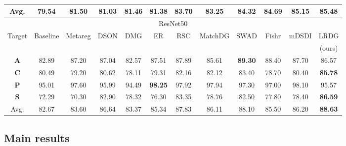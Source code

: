 \documentclass{article}
\begin{document}
\begin{table}[ht]
\begin{center}
\begin{tabular}{c|cccccccccc|c}
Avg. & 79.54 & 81.50 & 81.03 & 81.46 & 81.38 & 83.70 & 83.25 & 84.32 & 84.69 & 85.15 & \textbf{85.48}\\
\hline
\hline
\multicolumn{12}{c}{ResNet50}\\
\hline
\multirow{2}{*}{Target} & Baseline & Metareg & DSON & DMG & ER & RSC & MatchDG & SWAD & Fishr & mDSDI & LRDG\\
&  & \cite{balaji2018metareg} & \cite{seo2020learning} & \cite{chattopadhyay2020learning} & \cite{zhao2020domain} & \cite{huangRSC2020} &   \cite{mahajan2021domain} & \cite{cha2021swad} & \cite{rame2022fishr} & \cite{bui2021exploiting} & (ours) \\
\hline
\textbf{A} & 82.89 & 87.20 & 87.04 & 82.57 & 87.51 & 87.89 & 85.61 & \textbf{89.30} & 88.40 & 87.70 & 86.57 \\
\textbf{C} & 80.49 & 79.20 & 80.62 & 78.11 & 79.31 & 82.16 & 82.12 & 83.40 & 78.70 & 80.40 & \textbf{85.78} \\
\textbf{P} & 95.01 & 97.60 & 95.99 & 94.49 & \textbf{98.25} & 97.92 & 97.94 & 97.30 & 97.00 & 98.10 & 95.57 \\
\textbf{S} & 72.29 & 70.30 & 82.90 & 78.32 & 76.30 & 83.35 & 78.76 & 82.50 & 77.80 & 78.40 & \textbf{86.59} \\
Avg. & 82.67 & 83.60 & 86.64 & 83.37 & 85.34 & 87.83 & 86.11 & 88.10 & 85.50 & 86.20 & \textbf{88.63} \\
\hline
\hline
\end{tabular}
\end{center}
\label{tab:pacs}
\end{table}

\subsection{Main results}
\label{mainresult}
\end{document}
